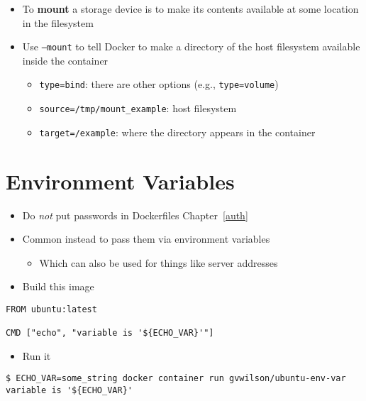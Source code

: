 \documentclass[krantzl]{krantz}
\newcommand{\chapref}[1]{Chapter~\ref{#1}}
\newcommand{\glossref}[1]{\textbf{#1}}
\begin{document}
\begin{itemize}
\item To \glossref{mount} a storage device is to make its contents available
    at some location in the filesystem

\item Use \texttt{--mount} to tell Docker to make a directory of the host filesystem available
    inside the container\begin{itemize}
\item \texttt{type=bind}: there are other options (e.g., \texttt{type=volume})

\item \texttt{source=/tmp/mount\_example}: host filesystem

\item \texttt{target=/example}: where the directory appears in the container

\end{itemize}


\end{itemize}
\section{Environment Variables}
\begin{itemize}
\item Do \emph{not} put passwords in Dockerfiles \chapref{auth}

\item Common instead to pass them via environment variables\begin{itemize}
\item Which can also be used for things like server addresses

\end{itemize}


\item Build this image

\end{itemize}
\begin{lstlisting}[frame=tblr]
FROM ubuntu:latest

CMD ["echo", "variable is '${ECHO_VAR}'"]
\end{lstlisting}

\begin{itemize}
\item Run it

\end{itemize}
\begin{lstlisting}[frame=tblr,backgroundcolor=\color{black!5}]
$ ECHO_VAR=some_string docker container run gvwilson/ubuntu-env-var
variable is '${ECHO_VAR}'
\end{lstlisting}
\end{document}
